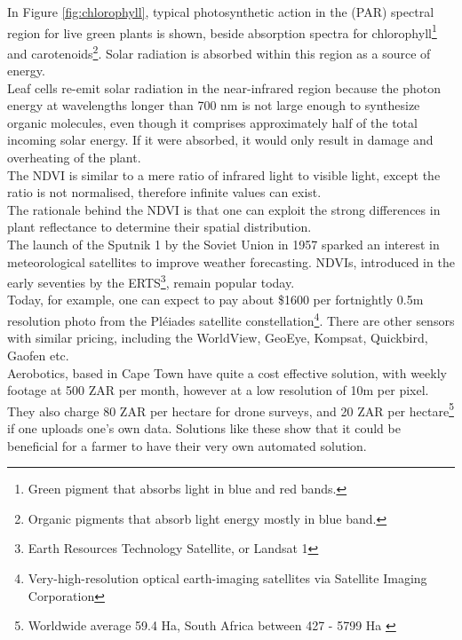 In Figure \ref{fig:chlorophyll}, typical photosynthetic action in the (PAR) spectral region for live green plants is shown, beside absorption spectra for chlorophyll\footnote{Green pigment that absorbs light in blue and red bands.} and carotenoids\footnote{Organic pigments that absorb light energy mostly in blue band.}. Solar radiation is absorbed within this region as a source of energy. \\

Leaf cells re-emit solar radiation in the near-infrared region because the photon energy at wavelengths longer than 700 nm is not large enough to synthesize organic molecules, even though it comprises approximately half of the total incoming solar energy. If it were absorbed, it would only result in damage and overheating of the plant.\\

The NDVI is similar to a mere ratio of infrared light to visible light, except the ratio is not normalised, therefore infinite values can exist.\\

The rationale behind the NDVI is that one can exploit the strong differences in plant reflectance to determine their spatial distribution.\\

The launch of the Sputnik 1 by the Soviet Union in 1957 sparked an interest in meteorological satellites to improve weather forecasting. NDVIs, introduced in the early seventies by the ERTS\footnote{Earth Resources Technology Satellite, or Landsat 1}, remain popular today. \\

Today, for example, one can expect to pay about \$1600 per fortnightly 0.5m resolution photo from the Pléiades satellite constellation\footnote{Very-high-resolution optical earth-imaging satellites via Satellite Imaging Corporation}. There are other sensors with similar pricing, including the WorldView, GeoEye, Kompsat, Quickbird, Gaofen etc.\\Aerobotics, based in Cape Town have quite a cost effective solution, with weekly footage at 500 ZAR per month, however at a low resolution of 10m per pixel. They also charge 80 ZAR per hectare for drone surveys, and 20 ZAR per hectare\footnote{Worldwide average 59.4 Ha\cite{farm_size}, South Africa between 427 - 5799 Ha \cite{farm_size_sa}} if one uploads one's own data. Solutions like these show that it could be beneficial for a farmer to have their very own automated solution.\\

